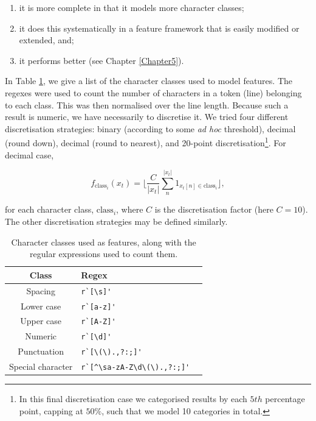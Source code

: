 \begin{enumerate}
\item it is more complete in that it models more character classes;
\item it does this systematically in a feature framework that is easily modified or extended, and;
\item it performs better (see Chapter \ref{Chapter5}).
\end{enumerate}

In Table \ref{table:characterclasses}, we give a list of the character classes used to model features. The regexes were used to count the number  of characters in a token (line) belonging to each class. This was then normalised over the line length. Because such a result is numeric, we have necessarily to discretise it. We tried four different discretisation strategies: binary (according to some \emph{ad hoc} threshold), decimal (round down), decimal (round to nearest), and 20-point discretisation\footnote{In this final discretisation case we categorised results by each $5th$ percentage point, capping at $50\%$, such that we model 10 categories in total.}. For decimal case,

\begin{equation}
f_{\text{class}_i}(x_t) = \Bigg\lfloor \frac{C}{|x_t|}\sum_n^{|x_t|} 1_{x_t[n] \in \text{class}_i} \Bigg\rfloor,
\label{eq:classfunctions}
\end{equation}

for each character class, $\text{class}_i$, where $C$ is the discretisation factor (here $C = 10$). The other discretisation strategies may be defined similarly.

\begin{table}[h]
\begin{center}
\begin{tabular}{|c|l|l|}
\hline
Class & Regex\\
\hline
Spacing & \verb|r`[\s]'|\\
Lower case & \verb|r`[a-z]'|\\
Upper case & \verb|r`[A-Z]'|\\
Numeric & \verb|r`[\d]'|\\
Punctuation & \verb|r`[\(\).,?:;]'|\\
Special character & \verb|r`[^\sa-zA-Z\d\(\).,?:;]'|\\
\hline
\end{tabular}
\caption[Character classes used as features, along with the regular expressions used to count them.]{Character classes used as features, along with the regular expressions used to count them.}
\label{table:characterclasses}
\end{center}
\end{table}


